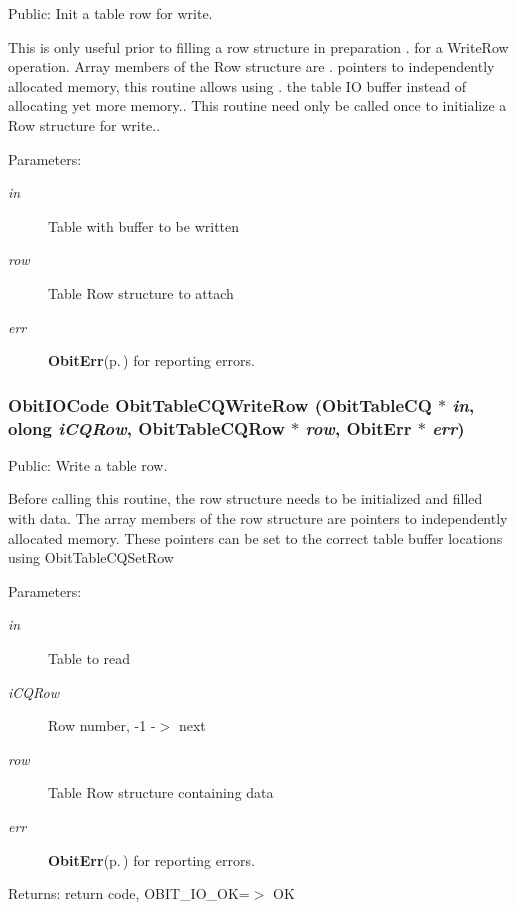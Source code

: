 Public: Init a table row for write. 

This is only useful prior to filling a row structure in preparation . for a Write\-Row operation. Array members of the Row structure are . pointers to independently allocated memory, this routine allows using . the table IO buffer instead of allocating yet more memory.. This routine need only be called once to initialize a Row structure for write.. \begin{Desc}
\item[Parameters:]
\begin{description}
\item[{\em in}]Table with buffer to be written \item[{\em row}]Table Row structure to attach \item[{\em err}]{\bf Obit\-Err}{\rm (p.\,\pageref{structObitErr})} for reporting errors. \end{description}
\end{Desc}
\subsubsection{\setlength{\rightskip}{0pt plus 5cm}Obit\-IOCode Obit\-Table\-CQWrite\-Row ({\bf Obit\-Table\-CQ} $\ast$ {\em in}, {\bf olong} {\em i\-CQRow}, {\bf Obit\-Table\-CQRow} $\ast$ {\em row}, {\bf Obit\-Err} $\ast$ {\em err})}\label{ObitTableCQ_8h_a20}


Public: Write a table row. 

Before calling this routine, the row structure needs to be initialized and filled with data. The array members of the row structure are pointers to independently allocated memory. These pointers can be set to the correct table buffer locations using Obit\-Table\-CQSet\-Row \begin{Desc}
\item[Parameters:]
\begin{description}
\item[{\em in}]Table to read \item[{\em i\-CQRow}]Row number, -1 -$>$ next \item[{\em row}]Table Row structure containing data \item[{\em err}]{\bf Obit\-Err}{\rm (p.\,\pageref{structObitErr})} for reporting errors. \end{description}
\end{Desc}
\begin{Desc}
\item[Returns:]return code, OBIT\_\-IO\_\-OK=$>$ OK \end{Desc}
